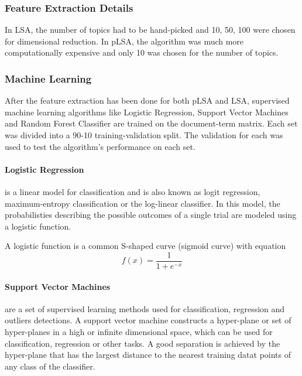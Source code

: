 \documentclass[12pt]{report}
\begin{document}
        \subsubsection{Feature Extraction Details}

            In LSA, the number of topics had to be hand-picked and 10, 50, 100 were chosen for dimensional reduction. 
            In pLSA, the algorithm was much more computationally expensive and only 10 was chosen for the number of topics.


        
        \subsubsection{Machine Learning}
        After the feature extraction has been done for both pLSA and LSA, supervised machine learning algorithms like Logistic Regression, Support Vector Machines and Random Forest Classifier are trained
        on the document-term matrix. Each set was divided into a 90-10 training-validation split. The validation for each was used to test the algorithm's 
        performance on each set.
        
        \paragraph{Logistic Regression}
        
        is a linear model for classification and is also known as logit regression, maximum-entropy 
        classification or the log-linear classifier. 
        In this model, the probabilisties describing the possible outcomes of a single trial are modeled using a logistic function.

        A logistic function is a common S-shaped curve (sigmoid curve) with equation 
        \begin{equation}
            f(x) = \frac{1}{1+ e^{-x}}
        \end{equation}

        \paragraph{Support Vector Machines}
        
        
        are a set of supervised learning methods used for classification, regression and outliers detections.
        A support vector machine constructs a hyper-plane or set of hyper-planes in a high or infinite dimensional space, which can be used for classification,
        regression or other tasks. A good separation is achieved by the hyper-plane that has the largest distance to the nearest training datat points of any class of the classifier.
\end{document}

